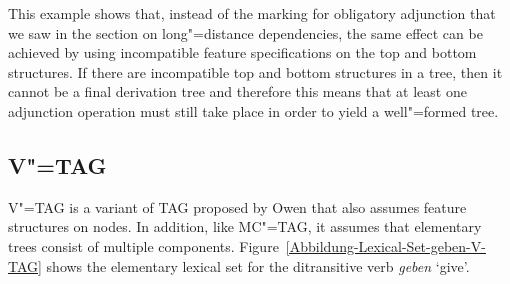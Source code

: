 This example shows that, instead of the marking for obligatory adjunction that we saw in the section on long"=distance
dependencies, the same effect can be achieved by using incompatible feature specifications on the top and bottom structures.
If there are incompatible top and bottom structures in a tree, then it cannot be a final derivation
tree and therefore this means that at least one adjunction operation must still take place in order
to yield a well"=formed tree.

\subsection{V"=TAG}
\label{sec-vtag}

V"=TAG 
is a variant of TAG proposed by Owen \citet{Rambow94a} that also assumes feature structures on
nodes. In addition, like MC"=TAG, it assumes that elementary trees consist of multiple components. Figure~\vref{Abbildung-Lexical-Set-geben-V-TAG} shows the elementary lexical set
for the ditransitive verb \emph{geben} `give'.
